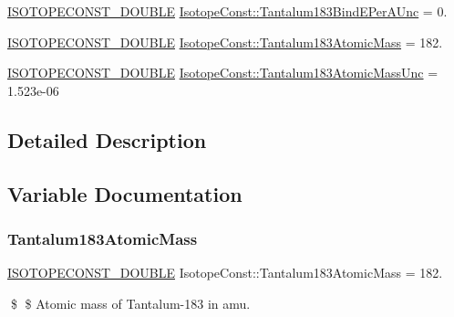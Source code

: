 \begin{DoxyCompactItemize}
\mbox{\hyperlink{group___isotope_const-_macros_ga8f45a7272ce02c0b4c65c44636ed719a}{I\+S\+O\+T\+O\+P\+E\+C\+O\+N\+S\+T\+\_\+\+D\+O\+U\+B\+LE}} \mbox{\hyperlink{group___isotope_const-_tantalum-_ta183_gafd7822c358b3f2ac1d2f7ae3435270f8}{Isotope\+Const\+::\+Tantalum183\+Bind\+E\+Per\+A\+Unc}} = 0.
\item 
\mbox{\hyperlink{group___isotope_const-_macros_ga8f45a7272ce02c0b4c65c44636ed719a}{I\+S\+O\+T\+O\+P\+E\+C\+O\+N\+S\+T\+\_\+\+D\+O\+U\+B\+LE}} \mbox{\hyperlink{group___isotope_const-_tantalum-_ta183_ga2f042dd618187a9cd8a35016cffa8d3a}{Isotope\+Const\+::\+Tantalum183\+Atomic\+Mass}} = 182.
\item 
\mbox{\hyperlink{group___isotope_const-_macros_ga8f45a7272ce02c0b4c65c44636ed719a}{I\+S\+O\+T\+O\+P\+E\+C\+O\+N\+S\+T\+\_\+\+D\+O\+U\+B\+LE}} \mbox{\hyperlink{group___isotope_const-_tantalum-_ta183_ga14e952ebb2cd59534c15874f64272310}{Isotope\+Const\+::\+Tantalum183\+Atomic\+Mass\+Unc}} = 1.\+523e-\/06
\end{DoxyCompactItemize}


\subsection{Detailed Description}


\subsection{Variable Documentation}
\mbox{\label{group___isotope_const-_tantalum-_ta183_ga2f042dd618187a9cd8a35016cffa8d3a}} 
\subsubsection{\texorpdfstring{Tantalum183\+Atomic\+Mass}{Tantalum183AtomicMass}}
{\footnotesize\ttfamily \mbox{\hyperlink{group___isotope_const-_macros_ga8f45a7272ce02c0b4c65c44636ed719a}{I\+S\+O\+T\+O\+P\+E\+C\+O\+N\+S\+T\+\_\+\+D\+O\+U\+B\+LE}} Isotope\+Const\+::\+Tantalum183\+Atomic\+Mass = 182.}

\$ \$ Atomic mass of Tantalum-\/183 in amu. \mbox{\label{group___isotope_const-_tantalum-_ta183_ga14e952ebb2cd59534c15874f64272310}} 
